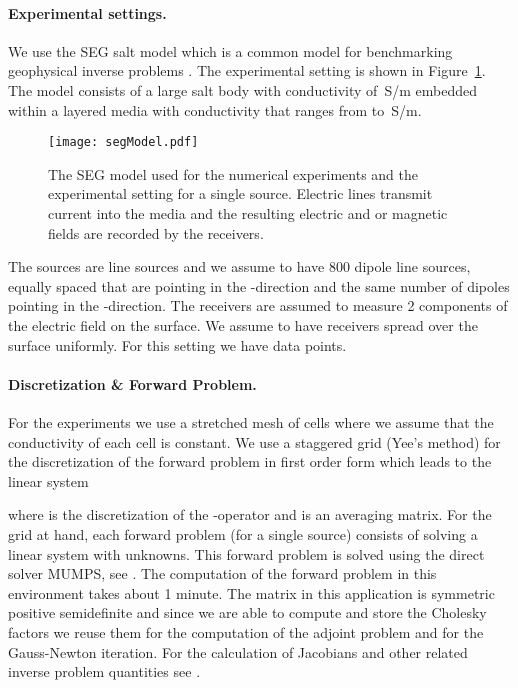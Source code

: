 \documentclass[12pt]{article}
\begin{document}
\paragraph{Experimental settings.}

We use the SEG salt model which is a common model for benchmarking geophysical inverse problems \cite{Alkhalifah1998}. The experimental setting is shown in Figure~\ref{fig1}. The model consists of a large salt body with conductivity of \,S/m embedded within a layered media with conductivity that ranges from  to \,S/m.
\begin{figure}
\begin{center}
\texttt{[image: segModel.pdf]}
\caption{The SEG model used for the numerical experiments and the experimental setting for a single source. Electric lines transmit current into the media and the resulting electric and or magnetic fields are recorded by the receivers.
\label{fig1}}
\end{center}
\end{figure}
The sources are line sources and we assume to have 800 dipole line sources,  equally spaced that are pointing in the -direction and the same number of  dipoles pointing in the -direction. The receivers are assumed to measure 2 components of the electric field on the surface. We assume to have  receivers spread over the surface uniformly. For this setting we have  data points.

\paragraph{Discretization \& Forward Problem.} For the experiments we use a stretched mesh of  cells where we assume that the conductivity of each cell is constant. We use a staggered grid (Yee's method) for the discretization of the forward problem in first order form \cite{yee,mm89,na,ha} which leads to the linear system

where  is the discretization of the -operator and  is an averaging matrix. For the grid at hand, each forward problem (for a single source) consists of solving a linear system with  unknowns. This forward problem is solved using the direct solver MUMPS, see \cite{MUMPS}. The computation of the forward problem in this environment takes about 1 minute. The matrix  in this application is symmetric positive semidefinite and since we are able to compute and store the Cholesky factors we reuse them for the computation of the adjoint problem and for the Gauss-Newton iteration.
For the calculation of Jacobians and other related inverse problem quantities see \cite{hao2}.
\end{document}

